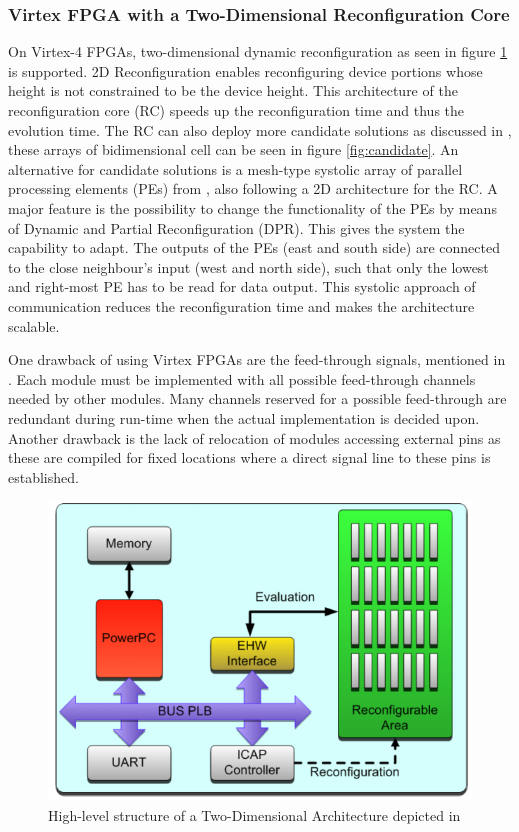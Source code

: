 \subsubsection{Virtex FPGA with a Two-Dimensional Reconfiguration Core}
\label{sec:fpga}
On Virtex-4 FPGAs, two-dimensional dynamic reconfiguration as seen in figure \ref{fig:2d} is supported. 2D Reconfiguration enables reconfiguring device portions whose height is not constrained to be the device height. This architecture of the reconfiguration core (RC) speeds up the reconfiguration time and thus the evolution time. The RC can also deploy more candidate solutions as discussed in \cite{virtex4}, these arrays of bidimensional cell can be seen in figure \ref{fig:candidate}. An alternative for candidate solutions is a mesh-type systolic array of parallel processing elements (PEs) from \cite{dpr}, also following a 2D architecture for the RC. A major feature is the possibility to change the functionality of the PEs by means of Dynamic and Partial Reconfiguration (DPR). This gives the system the capability to adapt. The outputs of the PEs (east and south side) are connected to the close neighbour's input (west and north side), such that only the lowest and right-most PE has to be read for data output. This systolic approach of communication reduces the reconfiguration time and makes the architecture scalable.

One drawback of using Virtex FPGAs are the feed-through signals, mentioned in \cite{erlangen}. Each module must be implemented with all possible feed-through channels needed by other modules. Many channels reserved for a possible feed-through are redundant during run-time when the actual implementation is decided upon. Another drawback is the lack of relocation of modules accessing external pins as these are compiled for fixed locations where a direct signal line to these pins is established. 
\begin{figure}[htb]%
\includegraphics[width=\columnwidth]{Pictures/2D_architecture.png}%
\caption{High-level structure of a Two-Dimensional Architecture depicted in \cite{virtex4}}%
\label{fig:2d}%
\end{figure}

